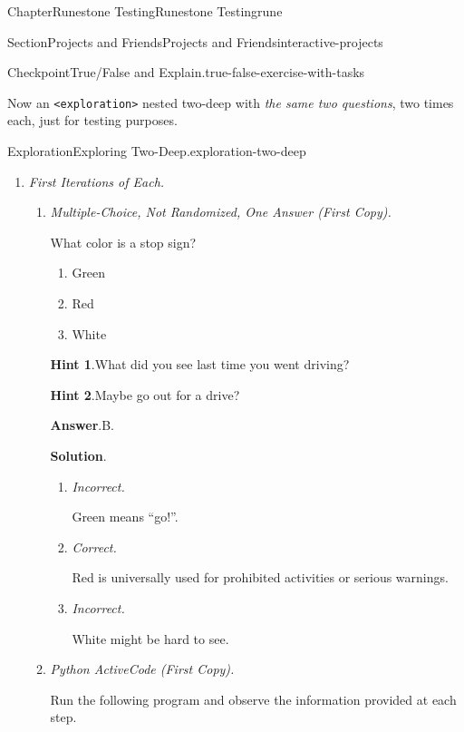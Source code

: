 \documentclass[oneside,10pt,]{book}
\newcommand{\blocktitlefont}{\relax}
\newcommand{\mono}[1]{\texttt{#1}}
\newcommand{\lititle}[1]{{\slshape#1}}
\numberwithin{equation}{section}
\begin{document}
\begin{chapterptx}{Chapter}{Runestone Testing}{}{Runestone Testing}{}{}{rune}
\begin{sectionptx}{Section}{Projects and Friends}{}{Projects and Friends}{}{}{interactive-projects}
\begin{inlineexercise}{Checkpoint}{True\slash{}False and Explain.}{true-false-exercise-with-tasks}
\end{inlineexercise}%
Now an \mono{<exploration>} nested two-deep with \emph{the same two questions}, two times each, just for testing purposes.%
\begin{exploration}{Exploration}{Exploring Two-Deep.}{exploration-two-deep}%
\begin{enumerate}[font=\bfseries,label=(\alph*),ref=\alph*]%
\item{}\lititle{First Iterations of Each.}\par%
\begin{enumerate}[font=\bfseries,label=(\roman*),ref=\theenumi.\roman*]%
\item{}\lititle{Multiple-Choice, Not Randomized, One Answer (First Copy).}\par%
What color is a stop sign?%
\par
%
\begin{enumerate}[label={\Alph*.}]
\item{}Green%
\item{}Red%
\item{}White%
\end{enumerate}
%
\par\smallskip%
\noindent\textbf{\blocktitlefont Hint 1}.\hypertarget{task-multiple-choice-first-4}{}\quad{}What did you see last time you went driving?%
\par\smallskip%
\noindent\textbf{\blocktitlefont Hint 2}.\hypertarget{task-multiple-choice-first-5}{}\quad{}Maybe go out for a drive?%
\par\smallskip%
\noindent\textbf{\blocktitlefont Answer}.\hypertarget{task-multiple-choice-first-6}{}\quad{}B.%
\par\smallskip%
\noindent\textbf{\blocktitlefont Solution}.\hypertarget{task-multiple-choice-first-7}{}\quad{}%
\begin{enumerate}[label={\Alph*.}]
\item{}\lititle{Incorrect.}\par%
Green means ``go!''.%
\item{}\lititle{Correct.}\par%
Red is universally used for prohibited activities or serious warnings.%
\item{}\lititle{Incorrect.}\par%
White might be hard to see.%
\end{enumerate}
%
\item{}\lititle{Python ActiveCode (First Copy).}\par%
Run the following program and observe the information provided at each step.%

\end{enumerate}
\end{enumerate}
\end{exploration}
\end{sectionptx}
\end{chapterptx}
\end{document}
